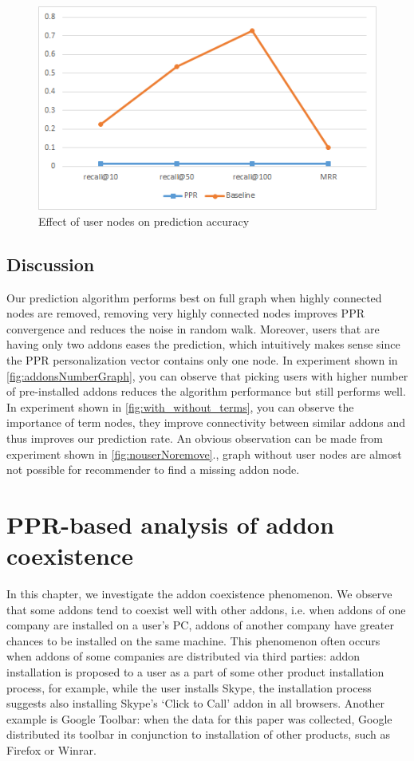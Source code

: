 \documentclass[11pt,oneside]{book}
\let\Oldsection\section
\renewcommand{\section}{\FloatBarrier\Oldsection}
\begin{document}
\begin{figure}[h]
\centering
\includegraphics[scale=.8,angle=0]{figures/nouserNoremove.png}
\caption{Effect of user nodes on prediction accuracy}
\label{fig:nouserNoremove}
\end{figure}


\section{Discussion}
Our prediction algorithm performs best on full graph when highly connected nodes are removed, removing very highly connected nodes improves PPR convergence and reduces the noise in random walk.
Moreover, users that are having only two addons eases the prediction, which intuitively makes sense since the PPR personalization vector contains only one node. In experiment shown in \autoref{fig:addonsNumberGraph}, you can observe that picking users with higher number of pre-installed addons reduces the algorithm performance but still performs well. In experiment shown in \autoref{fig:with_without_terms}, you can observe the importance of term nodes, they improve connectivity between similar addons and thus improves our prediction rate. An obvious observation can be made from experiment shown in \autoref{fig:nouserNoremove}., graph without user nodes are almost not possible for recommender to find a missing addon node.




\chapter{PPR-based analysis of addon coexistence}
\label{chap:Symbiosis}

In this chapter, we investigate the addon coexistence phenomenon. We observe that some addons tend to coexist well with other addons, i.e. when addons of one company are installed on a user's PC, addons of another company have greater chances to be installed on the same machine.  This phenomenon often occurs when addons of some companies are distributed via third parties: addon installation is proposed to a user as a part of some other product installation process, for example, while the user installs Skype, the installation process suggests also installing Skype's `Click to Call' addon in all browsers. Another example is Google Toolbar: when the data for this paper was collected, Google distributed its toolbar in conjunction to installation of other products, such as Firefox or Winrar.
\end{document}
